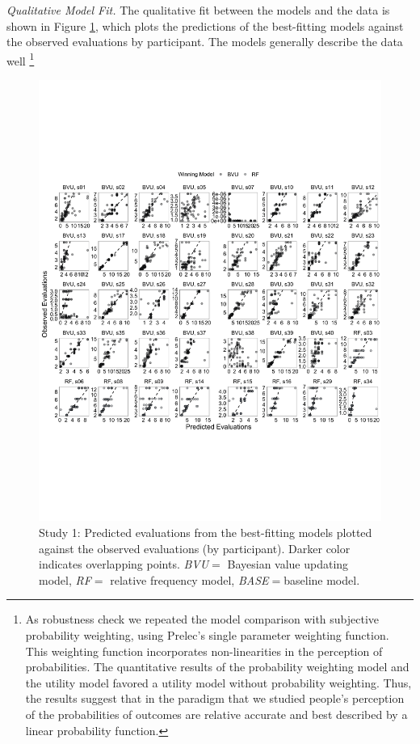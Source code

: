 \documentclass[
  a4paper, man, floatsintext]{apa6}
\begin{document}
\textit{Qualitative Model Fit.} The qualitative fit between the models
and the data is shown in Figure \ref{fig:fig3}, which plots the
predictions of the best-fitting models against the observed evaluations
by participant. The models generally describe the data well
\footnote{As robustness check we repeated the model comparison with subjective probability weighting, using Prelec’s \citeyear{Prelec1998} single parameter weighting function. This weighting function incorporates non-linearities in the perception of probabilities. The quantitative results of the probability weighting model and the utility model favored a utility model without probability weighting. Thus, the results suggest that in the paradigm that we studied people's perception of the probabilities of outcomes are relative accurate and best described by a linear probability function.}

\begin{figure}[htb]

{\centering \includegraphics[width=\textwidth]{../figures/fig3-1} 

}

\caption{Study 1: Predicted evaluations from the best-fitting models plotted against the observed evaluations (by participant). Darker color indicates overlapping points. \textit{BVU}$=$ Bayesian value updating model, \textit{RF}$=$ relative frequency model, \textit{BASE}$=$baseline model.}\label{fig:fig3}
\end{figure}
\end{document}
